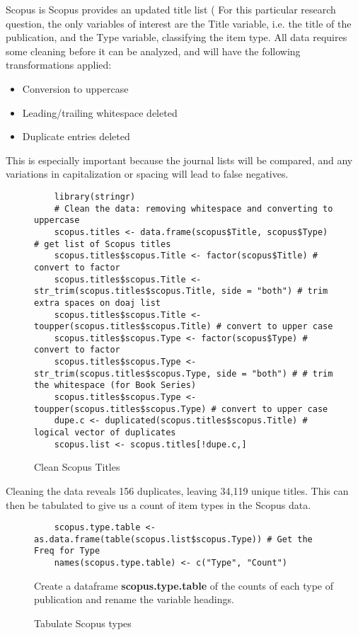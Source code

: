 \documentclass{article}
\begin{document}
Scopus is %
Scopus provides an updated title list (%
For this particular research question, the only variables of interest are the Title variable, i.e. the title of the publication, and the Type variable, classifying the item type.
All data requires some cleaning before it can be analyzed, and will have the following transformations applied:
\begin{itemize}
	\item Conversion to uppercase
	\item Leading/trailing whitespace deleted
	\item Duplicate entries deleted
\end{itemize}
This is especially important because the journal lists will be compared, and any variations in capitalization or spacing will lead to false negatives.
\begin{figure}
	\centering
	\begin{lstlisting}
	library(stringr)
	# Clean the data: removing whitespace and converting to uppercase
	scopus.titles <- data.frame(scopus$Title, scopus$Type) # get list of Scopus titles
	scopus.titles$scopus.Title <- factor(scopus$Title) # convert to factor
	scopus.titles$scopus.Title <- str_trim(scopus.titles$scopus.Title, side = "both") # trim extra spaces on doaj list
	scopus.titles$scopus.Title <- toupper(scopus.titles$scopus.Title) # convert to upper case
	scopus.titles$scopus.Type <- factor(scopus$Type) # convert to factor
	scopus.titles$scopus.Type <- str_trim(scopus.titles$scopus.Type, side = "both") # # trim the whitespace (for Book Series)
	scopus.titles$scopus.Type <- toupper(scopus.titles$scopus.Type) # convert to upper case
	dupe.c <- duplicated(scopus.titles$scopus.Title) # logical vector of duplicates
	scopus.list <- scopus.titles[!dupe.c,]
	\end{lstlisting}
	\caption{Clean Scopus Titles}
\end{figure}
Cleaning the data reveals 156 duplicates, leaving 34,119 unique titles. 
This can then be tabulated to give us a count of item types in the Scopus data.
\begin{figure}
	\centering
	\begin{lstlisting}
	scopus.type.table <- as.data.frame(table(scopus.list$scopus.Type)) # Get the Freq for Type
	names(scopus.type.table) <- c("Type", "Count")
	\end{lstlisting}
	\footnotesize{
		Create a dataframe \textbf{scopus.type.table} of the counts of each type of publication and rename the variable headings.
			}
	\caption{Tabulate Scopus types}
\end{figure}
\end{document}
